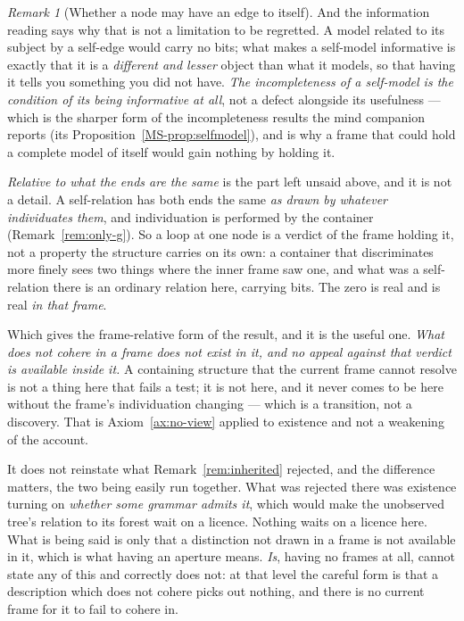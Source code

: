 \documentclass[11pt,a4paper]{article}
\theoremstyle{remark}\newtheorem{remark}[definition]{Remark}
\begin{document}
\begin{remark}[Whether a node may have an edge to itself]
And the information reading says why that is not a limitation to be regretted. A model related to its
subject by a self-edge would carry no bits; what makes a self-model informative is exactly that it is a
\emph{different and lesser} object than what it models, so that having it tells you something you did
not have. \emph{The incompleteness of a self-model is the condition of its being informative at all},
not a defect alongside its usefulness --- which is the sharper form of the incompleteness results the
mind companion reports (its Proposition~\ref{MS-prop:selfmodel}), and is why a frame that could hold a complete model of itself would gain
nothing by holding it.

\emph{Relative to what the ends are the same} is the part left unsaid above, and it is not a detail. A
self-relation has both ends the same \emph{as drawn by whatever individuates them}, and individuation is
performed by the container (Remark~\ref{rem:only-g}). So a loop at one node is a verdict of the frame
holding it, not a property the structure carries on its own: a container that discriminates more finely
sees two things where the inner frame saw one, and what was a self-relation there is an ordinary
relation here, carrying bits. The zero is real and is real \emph{in that frame}.

Which gives the frame-relative form of the result, and it is the useful one. \emph{What does not cohere
in a frame does not exist in it, and no appeal against that verdict is available inside it.} A
containing structure that the current frame cannot resolve is not a thing here that fails a test; it is
not here, and it never comes to be here without the frame's individuation changing --- which is a
transition, not a discovery. That is Axiom~\ref{ax:no-view} applied to existence and not a weakening of the account.

It does not reinstate what Remark~\ref{rem:inherited} rejected, and the difference matters, the two being easily run together. What was rejected there was existence turning on
\emph{whether some grammar admits it}, which would make the unobserved tree's relation to its forest
wait on a licence. Nothing waits on a licence here. What is being said is only that a distinction not
drawn in a frame is not available in it, which is what having an aperture means. \emph{Is}, having
no frames at all, cannot state any of this and correctly does not: at that level the careful form is
that a description which does not cohere picks out nothing, and there is no current frame for it to
fail to cohere in.
\end{remark}
\end{document}

